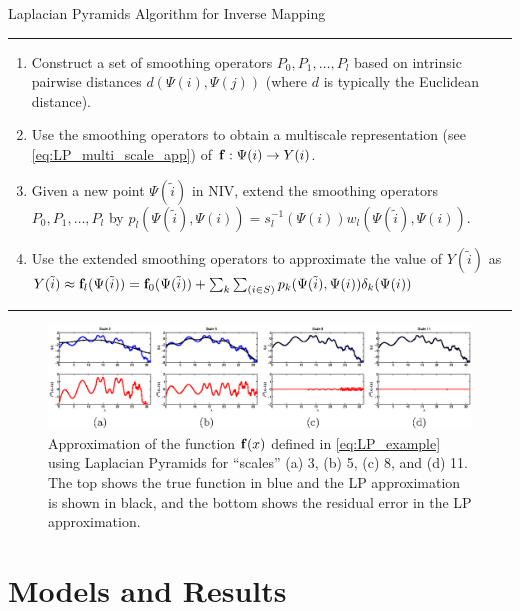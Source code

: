 \begin{table}[tb]
\caption{Laplacian Pyramids Algorithm for Inverse Mapping}
\hrule
\begin{enumerate}

\item
Construct a set of smoothing operators $P_0, P_1, \ldots, P_l$  based on intrinsic pairwise distances $d(\Psi(i),\Psi(j))$ (where $d$ is typically the Euclidean distance).

\item
Use the smoothing operators to obtain a multiscale representation (see \eqref{eq:LP_multi_scale_app}) of $\mathbf{f}:\Psi(i) \rightarrow Y(i)$.

\item Given a new point $\Psi(\tilde{i})$ in NIV, extend the smoothing operators $P_0, P_1, \ldots, P_l$  by
$p_l(\Psi(\tilde{i}), \Psi(i)) = s_l^{-1}(\Psi(i)) w_l(\Psi(\tilde{i}),\Psi(i))$.

\item
Use the extended smoothing operators to approximate the value of $Y(\tilde{i})$ as $Y(\tilde{i}) \approx \mathbf{f}_l(\Psi(\tilde{i})) = \mathbf{f}_0(\Psi(\tilde{i})) + \sum_{k}\sum_{(i \in S)}p_k(\Psi(\tilde{i}), \Psi(i))\delta_k(\Psi(i))$

\end{enumerate}
\hrule
\label{algo_LP}
\end{table}


\begin{figure}[t]
\includegraphics[width=6in]{fig2}
\caption[Function approximation using Laplacian Pyramids at different scales]{Approximation of the function $\mathbf{f}(x)$ defined in \eqref{eq:LP_example} using Laplacian Pyramids for ``scales'' (a) 3, (b) 5, (c) 8, and (d) 11. The top shows the true function in blue and the LP approximation is shown in black, and the bottom shows the residual error in the LP approximation.}
\label{fig:LP_ex}
\end{figure}

\section{Models and Results} \label{sec:examples}

